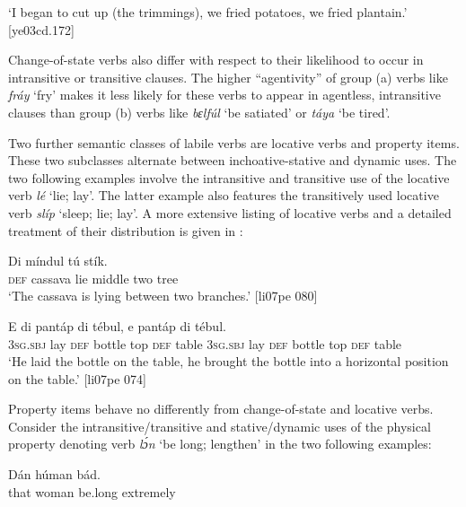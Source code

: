 \glt ‘I began to cut up (the trimmings), we fried potatoes, we fried plantain.’ [ye03cd.172]
\z

Change-of-state verbs also differ with respect to their likelihood to occur in intransitive or transitive clauses. The higher “agentivity” of group (a) verbs like \textit{fráy} ‘fry’ makes it less likely for these verbs to appear in agentless, intransitive clauses than group (b) verbs like \textit{bɛlfúl} ‘be satiated’ or \textit{táya} ‘be tired’.


Two further semantic classes of labile verbs are locative verbs and property items. These two subclasses alternate between inchoative-stative and dynamic uses. The two following examples involve the intransitive  and transitive  use of the locative verb \textit{lé} ‘lie; lay’. The latter example also features the transitively used locative verb \textit{slíp} ‘sleep; lie; lay’. A more extensive listing of locative verbs and a detailed treatment of their distribution is given in :



\ea%
    \label{ex:key:1114}
    \gll Di      míndul  tú  stík.\\
\textsc{def}  cassava  lie  middle  two  tree\\

\glt ‘The cassava is lying between two branches.’ [li07pe 080]
\z


\ea%
    \label{ex:key:1115}
    \gll E      di    pantáp  di  tébul,  e      
    pantáp  di  tébul.\\
\textsc{3sg.sbj}  lay  \textsc{def}  bottle  top    \textsc{def}  table  \textsc{3sg.sbj}  lay
\textsc{def}  bottle  top    \textsc{def}  table\\

\glt ‘He laid the bottle on the table, he brought the bottle into a 
horizontal position on the table.’ [li07pe 074]
\z

Property items behave no differently from change-of-state and locative verbs. Consider the intransitive/transitive and stative/dynamic uses of the physical property denoting verb \textit{lɔ́n} ‘be long; lengthen’ in the two following examples: 


\ea%
    \label{ex:key:1116}
    \gll Dán    húman      bád.\\
that    woman  be.long  extremely\\

